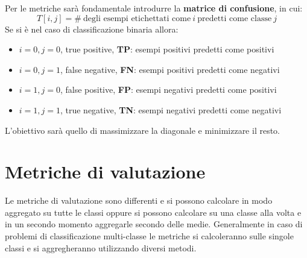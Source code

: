 Per le metriche sarà fondamentale introdurre la \textbf{matrice di confusione},
in cui:
\begin{equation}
    T[i,j] = \# \ \text{degli esempi etichettati come} \ i \ \text{predetti come
        classe} \ j
\end{equation}
Se si è nel caso di classificazione binaria allora:
\begin{itemize}
    \item $i=0, j=0$, true positive, \textbf{TP}: esempi positivi predetti come
          positivi
    \item $i=0, j=1$, false negative, \textbf{FN}: esempi positivi predetti come
          negativi
    \item $i=1, j=0$, false positive, \textbf{FP}: esempi negativi predetti come
          positivi
    \item $i=1, j=1$, true negative, \textbf{TN}: esempi negativi predetti come
          negativi
\end{itemize}
L'obiettivo sarà quello di massimizzare la diagonale e minimizzare il resto.
\section{Metriche di valutazione}
Le metriche di valutazione sono differenti e si possono calcolare in modo aggregato
su tutte le classi oppure si possono calcolare su una classe alla volta e in un
secondo momento aggregarle secondo delle medie. Generalmente in caso di problemi
di classificazione multi-classe le metriche si calcoleranno sulle singole classi e
si aggregheranno utilizzando diversi metodi.


